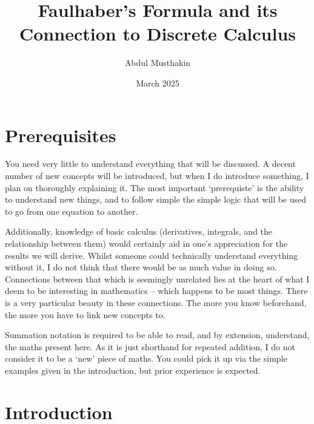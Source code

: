 \documentclass[a4paper]{article}
\title{Faulhaber's Formula and its Connection to Discrete Calculus}
\author{Abdul Musthakin}
\date{March 2025}
\theoremstyle{definition}
\begin{document}
\maketitle

\section{Prerequisites}

You need very little to understand everything that will be discussed.
A decent number of new concepts will be introduced, but when I do introduce something, I plan on thoroughly explaining it.
The most important `prerequiste' is the ability to understand new things, and to follow simple the simple logic that will be used to go from one equation to another.

Additionally, knowledge of basic calculus (derivatives, integrals, and the relationship between them) would certainly aid in one's appreciation for the results we will derive.
Whilst someone could technically understand everything without it, I do not think that there would be as much value in doing so.
Connections between that which is seemingly unrelated lies at the heart of what I deem to be interesting in mathematics -- which happens to be most things.
There is a very particular beauty in these connections.
The more you know beforehand, the more you have to link new concepts to.

Summation notation is required to be able to read, and by extension, understand, the maths present here.
As it is just shorthand for repeated addition, I do not consider it to be a `new' piece of maths.
You could pick it up via the simple examples given in the introduction, but prior experience is expected.

\section{Introduction}
\end{document}

